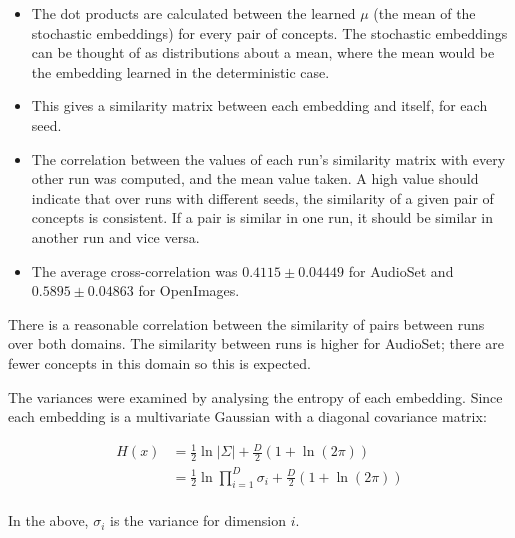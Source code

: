 \begin{itemize}
    \item The dot products are calculated between the learned $\mu$ (the mean of the stochastic embeddings) for every pair of concepts. The stochastic embeddings can be thought of as distributions about a mean, where the mean would be the embedding learned in the deterministic case. 
    \item This gives a similarity matrix between each embedding and itself, for each seed. 
    \item The correlation between the values of each run's similarity matrix with every other run was computed, and the mean value taken. A high value should indicate that over runs with different seeds, the similarity of a given pair of concepts is consistent. If a pair is similar in one run, it should be similar in another run and vice versa. 
    \item The average cross-correlation was $ 0.4115 \pm 0.04449$ for AudioSet and $0.5895 \pm 0.04863$ for OpenImages. 
\end{itemize}

There is a reasonable correlation between the similarity of pairs between runs over both domains. The similarity between runs is higher for AudioSet; there are fewer concepts in this domain so this is expected. 

The variances were examined by analysing the entropy of each embedding. Since each embedding is a multivariate Gaussian with a diagonal covariance matrix:

\begin{equation}
\begin{split}
H(x) &= \frac{1}{2} \ln |\Sigma| + \frac{D}{2}(1 + \ln(2 \pi))\\
&= \frac{1}{2} \ln \prod_{i=1}^D \sigma_i + \frac{D}{2}(1 + \ln(2 \pi))\\
\end{split}
\end{equation}

In the above, $\sigma_i$ is the variance for dimension $i$. 
 
